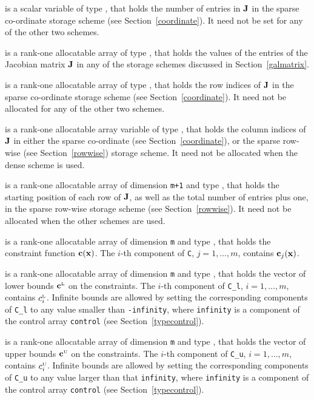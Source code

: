 \documentclass{galahad}
\newcommand{\sL}{\s{L}}
\newcommand{\sU}{\s{U}}
\begin{document}
\begin{description}
\begin{description}
 is a scalar variable of type \integer, that
holds the number of entries in ${\mathbf{J}}$
in the sparse co-ordinate storage scheme (see Section~\ref{coordinate}).
It need not be set for any of the other two schemes.

 is a rank-one allocatable array of type \realdp, that holds
the values of the entries of the Jacobian matrix ${\mathbf{J}}$ in any of the
storage schemes discussed in Section~\ref{galmatrix}.

 is a rank-one allocatable array of type \integer,
that holds the row indices of ${\mathbf{J}}$ in the sparse co-ordinate storage
scheme (see Section~\ref{coordinate}).
It need not be allocated for any of the other two schemes.

 is a rank-one allocatable array variable of type \integer,
that holds the column indices of ${\mathbf{J}}$ in either the sparse co-ordinate
(see Section~\ref{coordinate}), or the sparse row-wise
(see Section~\ref{rowwise}) storage scheme.
It need not be allocated when the dense scheme is used.

 is a rank-one allocatable array of dimension {\tt m+1} and type
\integer, that holds the starting position of
each row of ${\mathbf{J}}$, as well
as the total number of entries plus one, in the sparse row-wise storage
scheme (see Section~\ref{rowwise}). It need not be allocated when the
other schemes are used.

\end{description}

 is a rank-one allocatable array of dimension {\tt m} and type
\realdp, that holds the constraint function  ${\mathbf{c}}({\mathbf{x}})$.
The $i$-th component of
{\tt C}, $j = 1,  \ldots ,  m$, contains ${\mathbf{c}}_{j}({\mathbf{x}})$.

 is a rank-one allocatable array of dimension {\tt m} and type
\realdp, that holds
the vector of lower bounds $\bmc\sL$ on the constraints.
The $i$-th component of {\tt C\_l}, $i = 1, \ldots , m$, contains $c_{i}\sL$.
Infinite bounds are allowed by setting the corresponding
components of {\tt C\_l} to any value smaller than {\tt -infinity},
where {\tt infinity} is a component of the control array {\tt control}
(see Section~\ref{typecontrol}).

 is a rank-one allocatable array of dimension {\tt m} and type
\realdp, that holds
the vector of upper bounds $\bmc\sU$ on the constraints.
The $i$-th component of {\tt C\_u}, $i = 1, \ldots , m$, contains $c_{i}\sU$.
Infinite bounds are allowed by setting the corresponding
components of {\tt C\_u} to any value larger than that {\tt infinity},
where {\tt infinity} is a component of the control array {\tt control}
(see Section~\ref{typecontrol}).


\end{description}
\end{document}
